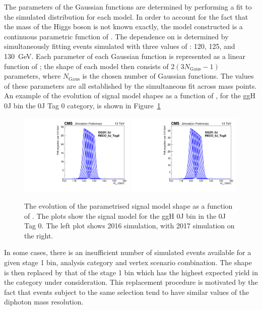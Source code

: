 The parameters of the Gaussian functions are determined by performing a fit 
to the simulated \mgg distribution for each model.
In order to account for the fact that the mass of the Higgs boson is not known exactly, 
the model constructed is a continuous parametric function of \mH.
The dependence on \mH is determined by simultaneously fitting events simulated with 
three values of \mH: 120, 125, and \SI{130}{GeV}.
Each parameter of each Gaussian function is represented as a linear function of \mH; 
the shape of each model then consists of $2\left(3N_{\textrm{Gaus}}-1\right)$ parameters, 
where $N_{\textrm{Gaus}}$ is the chosen number of Gaussian functions.
The values of these parameters are all established by the simultaneous fit across mass points.
An example of the evolution of signal model shapes as a function of \mH, 
for the ggH 0J bin the 0J Tag 0 category, is shown in Figure~\ref{fig:sigbkg_interp}

\begin{figure}[hptb]
\centering
\includegraphics[width=0.49\textwidth]{Figures/SigBkg/GG2H_0J_RECO_0J_Tag0_interp_2016.pdf}
\includegraphics[width=0.49\textwidth]{Figures/SigBkg/GG2H_0J_RECO_0J_Tag0_interp_2017.pdf}
\caption{
  The evolution of the parametrised signal model shape as a function of \mH.
  The plots show the signal model for the ggH 0J bin in the 0J Tag 0.
  The left plot shows 2016 simulation, with 2017 simulation on the right.
}
\label{fig:sigbkg_interp}
\end{figure}

In some cases, there is an insufficient number of simulated events available for a given stage 1 bin, 
analysis category and vertex scenario combination. %
The shape is then replaced by that of the stage 1 bin 
which has the highest expected yield in the category under consideration.
This replacement procedure is motivated by the fact that events subject to the same selection
tend to have similar values of the diphoton mass resolution.


